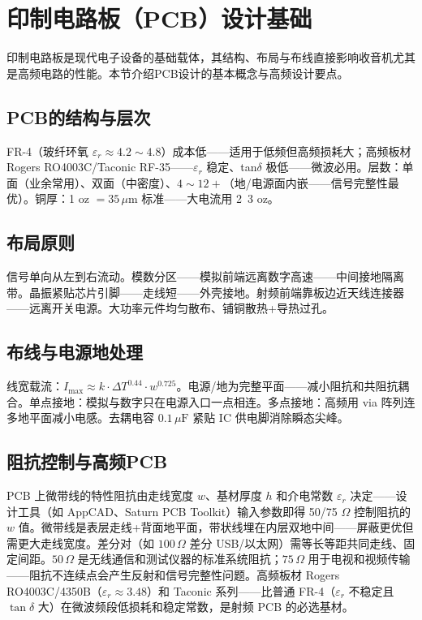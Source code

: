 \documentclass[12pt,UTF8]{ctexbook}
\begin{document}
\section{印制电路板（PCB）设计基础}
\label{sec:pcb_design_basics}

印制电路板是现代电子设备的基础载体，其结构、布局与布线直接影响收音机尤其是高频电路的性能。本节介绍PCB设计的基本概念与高频设计要点。

\subsection{PCB的结构与层次}
FR-4（玻纤环氧 $\varepsilon_r\approx4.2\sim4.8$）成本低——适用于低频但高频损耗大；高频板材 Rogers RO4003C/Taconic RF-35——$\varepsilon_r$ 稳定、tan$\delta$ 极低——微波必用。层数：单面（业余常用）、双面（中密度）、$4\sim12+$（地/电源面内嵌——信号完整性最优）。铜厚：1 oz $=35\,\mu\mathrm{m}$ 标准——大电流用 2~3 oz。

\subsection{布局原则}
信号单向从左到右流动。模数分区——模拟前端远离数字高速——中间接地隔离带。晶振紧贴芯片引脚——走线短——外壳接地。射频前端靠板边近天线连接器——远离开关电源。大功率元件均匀散布、铺铜散热+导热过孔。

\subsection{布线与电源地处理}
线宽载流：$I_{\max}\approx k\cdot\Delta T^{0.44}\cdot w^{0.725}$。电源/地为完整平面——减小阻抗和共阻抗耦合。单点接地：模拟与数字只在电源入口一点相连。多点接地：高频用 via 阵列连多地平面减小电感。去耦电容 $0.1\,\mu\mathrm{F}$ 紧贴 IC 供电脚消除瞬态尖峰。

\subsection{阻抗控制与高频PCB}
PCB 上微带线的特性阻抗由走线宽度 $w$、基材厚度 $h$ 和介电常数 $\varepsilon_r$ 决定——设计工具（如 AppCAD、Saturn PCB Toolkit）输入参数即得 50/75 $\Omega$ 控制阻抗的 $w$ 值。微带线是表层走线+背面地平面，带状线埋在内层双地中间——屏蔽更优但需更大走线宽度。差分对（如 $100\,\Omega$ 差分 USB/以太网）需等长等距共同走线、固定间距。$50\,\Omega$ 是无线通信和测试仪器的标准系统阻抗；$75\,\Omega$ 用于电视和视频传输——阻抗不连续点会产生反射和信号完整性问题。高频板材 Rogers RO4003C/4350B（$\varepsilon_r \approx 3.48$）和 Taconic 系列——比普通 FR-4（$\varepsilon_r$ 不稳定且 ${\tan\delta}$ 大）在微波频段低损耗和稳定常数，是射频 PCB 的必选基材。
\end{document}
